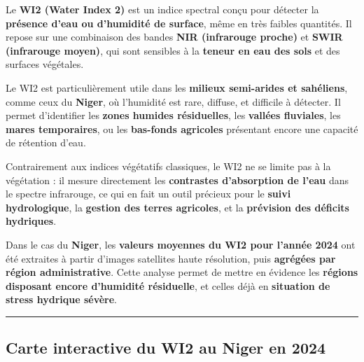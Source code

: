 \documentclass[
]{book}
\begin{document}
Le \textbf{WI2 (Water Index 2)} est un indice spectral conçu pour détecter la \textbf{présence d'eau ou d'humidité de surface}, même en très faibles quantités. Il repose sur une combinaison des bandes \textbf{NIR (infrarouge proche)} et \textbf{SWIR (infrarouge moyen)}, qui sont sensibles à la \textbf{teneur en eau des sols} et des surfaces végétales.

Le WI2 est particulièrement utile dans les \textbf{milieux semi-arides et sahéliens}, comme ceux du \textbf{Niger}, où l'humidité est rare, diffuse, et difficile à détecter. Il permet d'identifier les \textbf{zones humides résiduelles}, les \textbf{vallées fluviales}, les \textbf{mares temporaires}, ou les \textbf{bas-fonds agricoles} présentant encore une capacité de rétention d'eau.

Contrairement aux indices végétatifs classiques, le WI2 ne se limite pas à la végétation : il mesure directement les \textbf{contrastes d'absorption de l'eau} dans le spectre infrarouge, ce qui en fait un outil précieux pour le \textbf{suivi hydrologique}, la \textbf{gestion des terres agricoles}, et la \textbf{prévision des déficits hydriques}.

Dans le cas du \textbf{Niger}, les \textbf{valeurs moyennes du WI2 pour l'année 2024} ont été extraites à partir d'images satellites haute résolution, puis \textbf{agrégées par région administrative}. Cette analyse permet de mettre en évidence les \textbf{régions disposant encore d'humidité résiduelle}, et celles déjà en \textbf{situation de stress hydrique sévère}.

\begin{center}\rule{0.5\linewidth}{0.5pt}\end{center}

\subsection{Carte interactive du WI2 au Niger en 2024}\label{carte-interactive-du-wi2-au-niger-en-2024}
\end{document}
